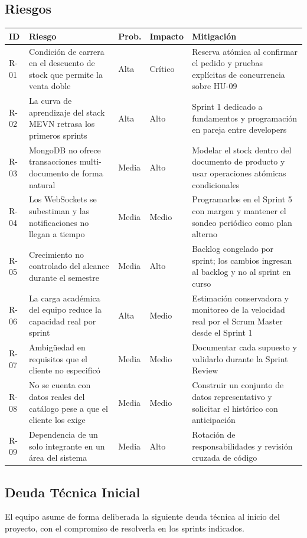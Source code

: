 \documentclass[12pt, a4paper]{article}
\begin{document}
\subsection{Riesgos}
\begin{longtable}{@{}p{1.2cm}p{4.5cm}p{1.5cm}p{1.7cm}p{5.5cm}@{}}
\toprule
\textbf{ID} & \textbf{Riesgo} & \textbf{Prob.} & \textbf{Impacto} & \textbf{Mitigación} \\
\midrule
\endhead
R-01 & Condición de carrera en el descuento de stock que permite la venta doble & Alta & Crítico & Reserva atómica al confirmar el pedido y pruebas explícitas de concurrencia sobre HU-09 \\
R-02 & La curva de aprendizaje del stack MEVN retrasa los primeros sprints & Alta & Alto & Sprint 1 dedicado a fundamentos y programación en pareja entre developers \\
R-03 & MongoDB no ofrece transacciones multi-documento de forma natural & Media & Alto & Modelar el stock dentro del documento de producto y usar operaciones atómicas condicionales \\
R-04 & Los WebSockets se subestiman y las notificaciones no llegan a tiempo & Media & Medio & Programarlos en el Sprint 5 con margen y mantener el sondeo periódico como plan alterno \\
R-05 & Crecimiento no controlado del alcance durante el semestre & Media & Alto & Backlog congelado por sprint; los cambios ingresan al backlog y no al sprint en curso \\
R-06 & La carga académica del equipo reduce la capacidad real por sprint & Alta & Medio & Estimación conservadora y monitoreo de la velocidad real por el Scrum Master desde el Sprint 1 \\
R-07 & Ambigüedad en requisitos que el cliente no especificó & Media & Medio & Documentar cada supuesto y validarlo durante la Sprint Review \\
R-08 & No se cuenta con datos reales del catálogo pese a que el cliente los exige & Media & Medio & Construir un conjunto de datos representativo y solicitar el histórico con anticipación \\
R-09 & Dependencia de un solo integrante en un área del sistema & Media & Alto & Rotación de responsabilidades y revisión cruzada de código \\
\bottomrule
\end{longtable}

\subsection{Deuda Técnica Inicial}
El equipo asume de forma deliberada la siguiente deuda técnica al inicio del proyecto, con el compromiso de resolverla en los sprints indicados.
\end{document}
